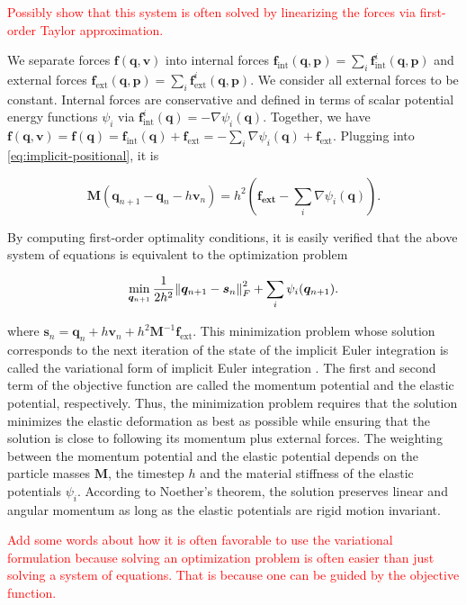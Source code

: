 \textcolor{red}{Possibly show that this system is often solved by linearizing the forces via first-order Taylor approximation.}

We separate forces $\bm{f}(\bm{q}, \bm{v})$ into internal forces $\bm{f}_{\text{int}}(\bm{q}, \bm{p}) = \sum_i \bm{f}^i_{\text{int}}
(\bm{q}, \bm{p})$ and external forces $\bm{f}_{\text{ext}}(\bm{q}, \bm{p}) = \sum_i \bm{f}^i_{\text{ext}}(\bm{q}, \bm{p})$. 
We consider all external forces to be constant. Internal forces are conservative and defined in terms of scalar potential energy functions 
$\psi_i$ via $\bm{f}^i_{\text{int}}(\bm{q}) = -\nabla \psi_i(\bm{q})$. Together, we have $\bm{f}(\bm{q}, \bm{v}) = \bm{f} (\bm{q}) 
= \bm{f}_{\text{int}} (\bm{q}) + \bm{f}_{\text{ext}} = -\sum_i \nabla \psi_i(\bm{q}) + \bm{f}_{\text{ext}}$. Plugging into 
\cref{eq:implicit-positional}, it is

\[
    \bm{M}(\bm{q}_{n+1} - \bm{q}_n - h\bm{v}_n) = h^2(\bm{f_\text{ext}} - \sum_i \nabla \psi_i(\bm{q})).
\]

By computing first-order optimality conditions, it is easily verified that the above system of equations is equivalent to the optimization 
problem

\begin{equation}\label{eq:variational-implicit}
    \min_{\bm{q}_{n+1}} \frac{1}{2h^2} \norm{\bm{q}_{n+1} - \bm{s}_n}^2_F + \sum_i \psi_i(\bm{q}_{n+1}).
\end{equation}

\noindent where $\bm{s}_n = \bm{q}_n + h\bm{v}_n + h^2\bm{M}^{-1}\bm{f}_{\text{ext}}$. This minimization problem whose solution corresponds to the next
iteration of the state of the implicit Euler integration is called the variational form of implicit Euler integration \cite{bouaziz2014}. 
The first and second term of the objective function are called the momentum potential and the elastic potential, respectively. Thus, the 
minimization problem requires that the solution minimizes the elastic deformation as best as possible while ensuring that the solution is 
close to following its momentum plus external forces. The weighting between the momentum potential and the elastic potential depends on the 
particle masses $\bm{M}$, the timestep $h$ and the material stiffness of the elastic potentials $\psi_i$. According to Noether's theorem, 
the solution preserves linear and angular momentum as long as the elastic potentials are rigid motion invariant.

\textcolor{red}{Add some words about how it is often favorable to use the variational formulation because solving an optimization problem is
often easier than just solving a system of equations. That is because one can be guided by the objective function.}

